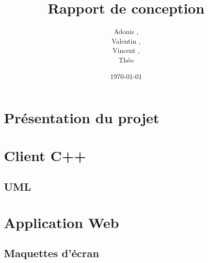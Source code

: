 \documentclass[a4paper]{article}
\title{Rapport de conception}
\author{Adonis \bsc{Najimi},\\
 Valentin \bsc{Stern},\\
 Vincent \bsc{Albert},\\
 Théo \bsc{Gerriet}}
\date{\today}
\begin{document}
\maketitle
\section{Présentation du projet}
\section{Client C++}
\subsection{UML}
\section{Application Web}
\subsection{Maquettes d'écran}
\end{document}
